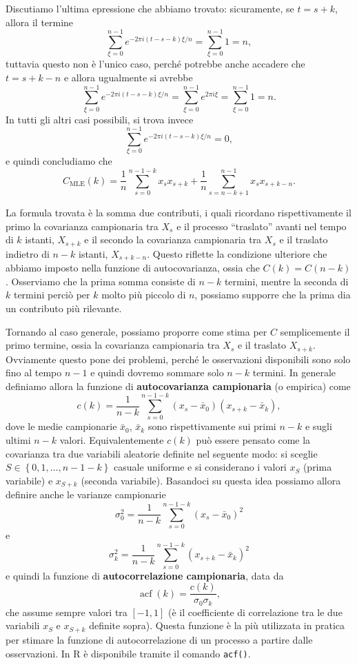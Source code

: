 \documentclass[
  italian,
  letterpaper,
]{book}
\newcommand{\cur}[1]{\left\{ #1 \right\}}
\newcommand{\mle}{\operatorname{MLE}}
\theoremstyle{definition}
\theoremstyle{remark}
\begin{document}
Discutiamo l'ultima epressione che abbiamo trovato: sicuramente, se
\(t=s+k\), allora il termine
\[ \sum_{\xi=0}^{n-1} e^{-2 \pi i (t-s-k)\xi/n} = \sum_{\xi=0}^{n-1} 1 = n,\]
tuttavia questo non è l'unico caso, perché potrebbe anche accadere che
\(t = s+k-n\) e allora ugualmente si avrebbe
\[ \sum_{\xi=0}^{n-1} e^{-2 \pi i (t-s-k)\xi/n} = \sum_{\xi=0}^{n-1} e^{2 \pi i \xi } = \sum_{\xi=0}^{n-1} 1 = n.\]
In tutti gli altri casi possibili, si trova invece
\[ \sum_{\xi=0}^{n-1} e^{-2 \pi i (t-s-k)\xi/n} = 0,\] e quindi
concludiamo che
\[ C_{\mle} (k) = \frac 1 n \sum_{s=0}^{n-1-k}x_s x_{s+k} + \frac 1 n \sum_{s=n-k+1}^{n-1}x_s x_{s+k-n}.\]

La formula trovata è la somma due contributi, i quali ricordano
rispettivamente il primo la covarianza campionaria tra \(X_s\) e il
processo ``traslato'' avanti nel tempo di \(k\) istanti, \(X_{s+k}\) e
il secondo la covarianza campionaria tra \(X_s\) e il traslato indietro
di \(n-k\) istanti, \(X_{s+k-n}\). Questo riflette la condizione
ulteriore che abbiamo imposto nella funzione di autocovarianza, ossia
che \(C(k)= C(n-k)\). Osserviamo che la prima somma consiste di \(n-k\)
termini, mentre la seconda di \(k\) termini perciò per \(k\) molto più
piccolo di \(n\), possiamo supporre che la prima dia un contributo più
rilevante.

Tornando al caso generale, possiamo proporre come stima per \(C\)
semplicemente il primo termine, ossia la covarianza campionaria tra
\(X_s\) e il traslato \(X_{s+k}\). Ovviamente questo pone dei problemi,
perché le osservazioni disponibili sono solo fino al tempo \(n-1\) e
quindi dovremo sommare solo \(n-k\) termini. In generale definiamo
allora la funzione di \textbf{autocovarianza campionaria} (o empirica)
come
\[ c(k) = \frac{1}{n-k}\sum_{s=0}^{n-1-k} (x_s - \bar{x}_0)(x_{s+k} - \bar{x}_{k}),\]
dove le medie campionarie \(\bar{x}_0\), \(\bar{x}_k\) sono
rispettivamente sui primi \(n-k\) e sugli ultimi \(n-k\) valori.
Equivalentemente \(c(k)\) può essere pensato come la covarianza tra due
variabili aleatorie definite nel seguente modo: si sceglie
\(S \in \cur{0,1, \ldots, n-1-k}\) casuale uniforme e si considerano i
valori \(x_{S}\) (prima variabile) e \(x_{S+k}\) (seconda variabile).
Basandoci su questa idea possiamo allora definire anche le varianze
campionarie
\[ \sigma^2_0 =  \frac{1}{n-k}\sum_{s=0}^{n-1-k} (x_s - \bar{x}_0)^2\] e
\[ \sigma^2_k =  \frac{1}{n-k}\sum_{s=0}^{n-1-k} (x_{s+k} - \bar{x}_k)^2\]
e quindi la funzione di \textbf{autocorrelazione campionaria}, data da
\[ \operatorname{acf}(k) = \frac{c(k)}{\sigma_0 \sigma_k},\] che assume
sempre valori tra \([-1,1]\) (è il coefficiente di correlazione tra le
due variabili \(x_{S}\) e \(x_{S+k}\) definite sopra). Questa funzione è
la più utilizzata in pratica per stimare la funzione di autocorrelazione
di un processo a partire dalle osservazioni. In R è disponibile tramite
il comando \texttt{acf()}.
\end{document}
